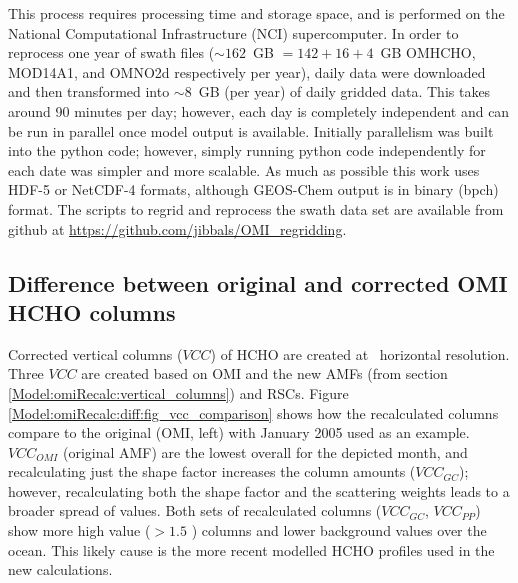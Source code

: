     This process requires processing time and storage space, and is performed on the National Computational Infrastructure (NCI) supercomputer.
    In order to reprocess one year of swath files ($\sim 162$~GB $ = 142 + 16 + 4$~GB OMHCHO, MOD14A1, and OMNO2d respectively per year), daily data were  downloaded and then transformed into $\sim 8$~GB (per year) of daily gridded data.
    This takes around 90 minutes per day; however, each day is completely independent and can be run in parallel once model output is available.
    Initially parallelism was built into the python code; however, simply running python code independently for each date was simpler and more scalable.
    As much as possible this work uses HDF-5 or NetCDF-4 formats, although GEOS-Chem output is in binary (bpch) format.
    The scripts to regrid and reprocess the swath data set are available from github at \url{https://github.com/jibbals/OMI_regridding}.
  
  \subsection{Difference between original and corrected OMI HCHO columns}
  \label{Model:omiRecalc:diff}
    
    Corrected vertical columns ($VCC$) of HCHO are created at \highhr ~horizontal resolution.
    Three $VCC$ are created based on OMI and the new AMFs (from section \ref{Model:omiRecalc:vertical_columns}) and RSCs.
    Figure \ref{Model:omiRecalc:diff:fig_vcc_comparison} shows how the recalculated columns compare to the original (OMI, left) with January 2005 used as an example. 
    $VCC_{OMI}$ (original AMF) are the lowest overall for the depicted month, and recalculating just the shape factor increases the column amounts ($VCC_{GC}$); however, recalculating both the shape factor and the scattering weights leads to a broader spread of values.
    Both sets of recalculated columns ($VCC_{GC}$, $VCC_{PP}$) show more high value ($>1.5$ \moleccm) columns and lower background values over the ocean.
    This likely cause is the more recent modelled HCHO profiles used in the new calculations.
    
    
    
